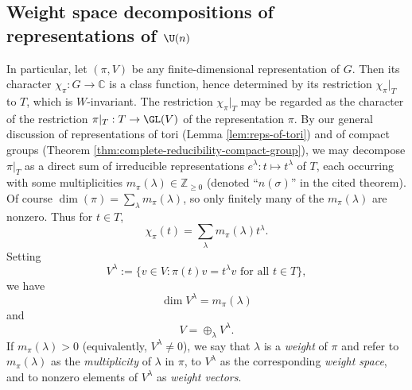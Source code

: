 \documentclass[reqno]{amsart} 
\begin{document}
\subsection{Weight space decompositions
  of representations of \texorpdfstring{$\U(n)$}{U(n)}}\label{sec:weight-decmop-U-n}
In particular, let $(\pi,V)$ be any finite-dimensional representation of $G$.  Then its character $\chi_\pi : G \rightarrow \mathbb{C}$ is a class function, hence determined by its restriction $\chi_\pi|_{T}$ to $T$, which is $W$-invariant.  The restriction $\chi_{\pi}|_{T}$ may be regarded as the character of the restriction $\pi|_T : T \rightarrow \GL(V)$ of the representation $\pi$.  By our general discussion of representations of tori (Lemma \ref{lem:reps-of-tori}) and of compact groups (Theorem \ref{thm:complete-reducibility-compact-group}), we may decompose $\pi|_T$ as a direct sum of irreducible representations $e^\lambda : t \mapsto t^\lambda$ of $T$, each occurring with some multiplicities $m_\pi(\lambda) \in \mathbb{Z}_{\geq 0}$ (denoted ``$n(\sigma)$'' in the cited theorem).  Of course $\dim(\pi) = \sum _{\lambda} m_\pi (\lambda)$, so only finitely many of the $m_\pi(\lambda)$ are nonzero.  Thus for $t \in T$,
\begin{equation}\label{eq:}
  \chi_\pi(t)
  =
  \sum_{\lambda}
  m_\pi(\lambda) t^\lambda.
\end{equation}
Setting
\begin{equation*}
V^{\lambda} := \{v \in V : \pi(t) v = t^\lambda v \text{ for all } t \in T\},
\end{equation*}
 we have 
\begin{equation*}
\dim V^{\lambda} = m_\pi(\lambda)
\end{equation*}
 and
\begin{equation*}
V = \oplus_{\lambda} V^{\lambda}.
\end{equation*}
 If $m_\pi(\lambda) > 0$ (equivalently, $V^{\lambda} \neq 0$), we say that $\lambda$ is a \emph{weight} of $\pi$ and refer to $m_\pi(\lambda)$ as the \emph{multiplicity} of $\lambda$ in $\pi$, to $V^{\lambda}$ as the corresponding \emph{weight space}, and to nonzero elements of $V^{\lambda}$ as \emph{weight vectors}.
\end{document}
